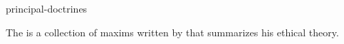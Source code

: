 \documentclass{stex}
\begin{document}
\begin{smodule}{principal-doctrines}
\begin{sparagraph}[style=symdoc]
The  is a collection of maxims written by
 that summarizes his ethical theory.
\end{sparagraph}
\end{smodule}
\end{document}
